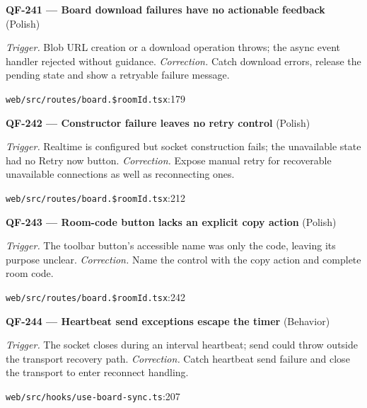 \begin{minipage}{\linewidth}
\textbf{QF-241 --- Board download failures have no actionable feedback} {\scriptsize\color{accent}(Polish)}\par
\textit{Trigger.} Blob URL creation or a download operation throws; the async event handler rejected without guidance. \textit{Correction.} Catch download errors, release the pending state and show a retryable failure message.\par
{\scriptsize\color{muted}\nolinkurl{web/src/routes/board.$roomId.tsx}:179}\par
\end{minipage}\par\vspace{7pt}
\begin{minipage}{\linewidth}
\textbf{QF-242 --- Constructor failure leaves no retry control} {\scriptsize\color{accent}(Polish)}\par
\textit{Trigger.} Realtime is configured but socket construction fails; the unavailable state had no Retry now button. \textit{Correction.} Expose manual retry for recoverable unavailable connections as well as reconnecting ones.\par
{\scriptsize\color{muted}\nolinkurl{web/src/routes/board.$roomId.tsx}:212}\par
\end{minipage}\par\vspace{7pt}
\begin{minipage}{\linewidth}
\textbf{QF-243 --- Room-code button lacks an explicit copy action} {\scriptsize\color{accent}(Polish)}\par
\textit{Trigger.} The toolbar button's accessible name was only the code, leaving its purpose unclear. \textit{Correction.} Name the control with the copy action and complete room code.\par
{\scriptsize\color{muted}\nolinkurl{web/src/routes/board.$roomId.tsx}:242}\par
\end{minipage}\par\vspace{7pt}
\begin{minipage}{\linewidth}
\textbf{QF-244 --- Heartbeat send exceptions escape the timer} {\scriptsize\color{accent}(Behavior)}\par
\textit{Trigger.} The socket closes during an interval heartbeat; send could throw outside the transport recovery path. \textit{Correction.} Catch heartbeat send failure and close the transport to enter reconnect handling.\par
{\scriptsize\color{muted}\nolinkurl{web/src/hooks/use-board-sync.ts}:207}\par
\end{minipage}\par\vspace{7pt}
